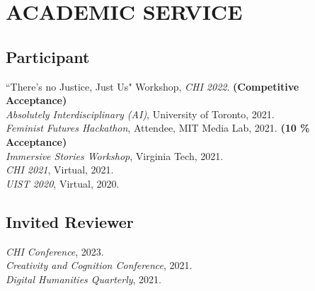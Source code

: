  \section{ACADEMIC SERVICE}

 \subsection{Participant}
``There's no Justice, Just Us" Workshop, \emph{CHI 2022}. \textbf{(Competitive Acceptance)}\\
\emph{Absolutely Interdisciplinary (AI)}, University of Toronto, 2021.\\
\emph{Feminist Futures Hackathon}, Attendee, MIT Media Lab, 2021. \textbf{(10 \% Acceptance)}\\
\emph{Immersive Stories Workshop}, Virginia Tech, 2021.\\
\emph{CHI 2021}, Virtual, 2021. \\
\emph{UIST 2020}, Virtual, 2020. 

  \subsection{Invited Reviewer}
   \emph{CHI Conference}, 2023. \\
 \emph{Creativity and Cognition Conference}, 2021. \\
  \emph{Digital Humanities Quarterly}, 2021. \\